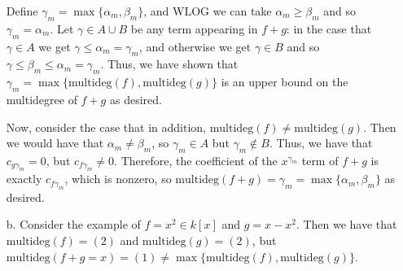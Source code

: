 \documentclass[12pt]{amsart}
\theoremstyle{definition}
\begin{document}
\begin{flushleft}
\begin{enumerate}
    Define $\gamma_m = \max \{\alpha_m, \beta_m\}$, and WLOG we can take $\alpha_m \ge \beta_m$ and so $\gamma_m = \alpha_m$. Let $\gamma \in A \cup B$ be any term appearing in $f+ g$: in the case that $\gamma \in A$ we get $\gamma \le \alpha_m = \gamma_m$, and otherwise we get $\gamma \in B$ and so $\gamma \le \beta_m \le \alpha_m = \gamma_m$. Thus, we have shown that $\gamma_m = \max \{\text{multideg}(f),\text{multideg}(g)\}$ is an upper bound on the multidegree of $f+g$ as desired.

    Now, consider the case that in addition, $\text{multideg}(f)\ne \text{multideg}(g)$. Then we would have that $\alpha_m \ne \beta_m$, so $\gamma_m \in A$ but $\gamma_m \not \in B$. Thus, we have that $c_{g\gamma_m} = 0$, but $c_{f\gamma_m} \ne 0$. Therefore, the coefficient of the $x^{\gamma_m}$ term of $f+g$ is exactly $c_{f\gamma_m}$, which is nonzero, so $\text{multideg}(f+g) = \gamma_m = \max \{\alpha_m, \beta_m\}$ as desired.
    \item[b.] Consider the example of $f=x^2 \in k[x]$ and $g = x-x^2$. Then we have that $\text{multideg}(f) = (2)$ and $\text{multideg}(g)=(2)$, but $\text{multideg}(f+g=x)=(1)\ne \max\{\text{multideg}(f),\text{multideg}(g)\}$.


\end{enumerate}
\end{flushleft}
\end{document}
